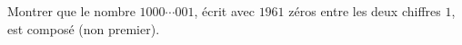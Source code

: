 Montrer que le nombre $1000\cdots001$, écrit avec $1961$ zéros entre les deux chiffres $1$, est composé (non premier).
